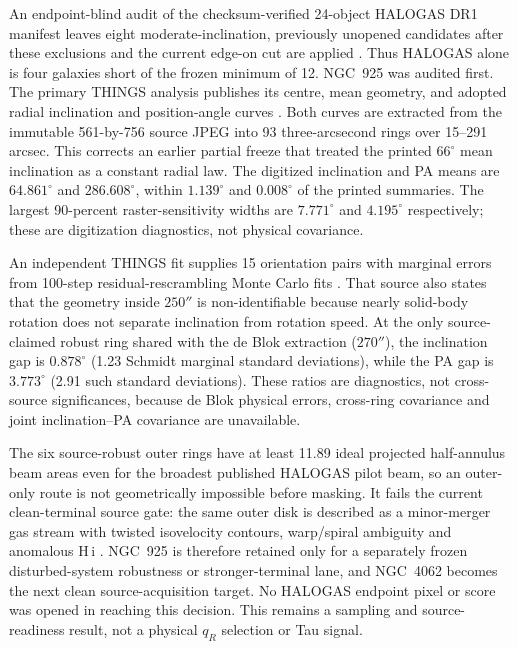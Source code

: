 \documentclass[11pt]{article}
\begin{document}
An endpoint-blind audit of the checksum-verified 24-object HALOGAS DR1
manifest leaves eight moderate-inclination, previously unopened candidates
after these exclusions and the current edge-on cut are applied
\cite{Heald2011HALOGAS,Heald2019HALOGASDR1}. Thus HALOGAS alone is four
galaxies short of the frozen minimum of 12. NGC~925 was audited first. The
primary THINGS analysis publishes its centre, mean geometry, and adopted radial
inclination and position-angle curves \cite{deBlok2008THINGSRotation}. Both
curves are extracted from the immutable 561-by-756 source JPEG into 93
three-arcsecond rings over 15--291 arcsec. This corrects an earlier partial
freeze that treated the printed $66^\circ$ mean inclination as a constant
radial law. The digitized inclination and PA means are $64.861^\circ$ and
$286.608^\circ$, within $1.139^\circ$ and $0.008^\circ$ of the printed
summaries. The largest 90-percent raster-sensitivity widths are
$7.771^\circ$ and $4.195^\circ$ respectively; these are digitization
diagnostics, not physical covariance.

An independent THINGS fit supplies 15 orientation pairs with marginal errors
from 100-step residual-rescrambling Monte Carlo fits
\cite{Schmidt2016THINGSRadialGas}. That source also states that the geometry
inside $250''$ is non-identifiable because nearly solid-body rotation does not
separate inclination from rotation speed. At the only source-claimed robust
ring shared with the de Blok extraction ($270''$), the inclination gap is
$0.878^\circ$ (1.23 Schmidt marginal standard deviations), while the PA gap is
$3.773^\circ$ (2.91 such standard deviations). These ratios are diagnostics,
not cross-source significances, because de Blok physical errors, cross-ring
covariance and joint inclination--PA covariance are unavailable.

The six source-robust outer rings have at least 11.89 ideal projected
half-annulus beam areas even for the broadest published HALOGAS pilot beam, so
an outer-only route is not geometrically impossible before masking. It fails
the current clean-terminal source gate: the same outer disk is described as a
minor-merger gas stream with twisted isovelocity contours, warp/spiral
ambiguity and anomalous H\,{\sc i} \cite{Heald2011HALOGAS}. NGC~925 is
therefore retained only for a separately frozen disturbed-system robustness or
stronger-terminal lane, and NGC~4062 becomes the next clean source-acquisition
target. No HALOGAS endpoint pixel or score was opened in reaching this
decision. This remains a sampling and source-readiness result, not a physical
$q_R$ selection or Tau signal.
\end{document}
